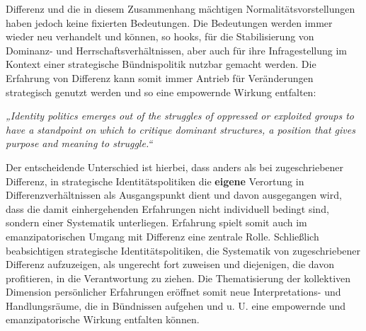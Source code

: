 \noindent Differenz und die in diesem Zusammenhang mächtigen Normalitätsvorstellungen
haben jedoch keine fixierten Bedeutungen. Die Bedeutungen werden immer wieder
neu verhandelt und können, so hooks, für die Stabilisierung von Dominanz- und
Herrschaftsverhältnissen, aber auch für ihre Infragestellung im Kontext einer
strategische Bündnispolitik nutzbar gemacht werden. Die Erfahrung von Differenz
kann somit immer Antrieb für Veränderungen strategisch genutzt werden und so
eine empowernde Wirkung entfalten:
\begin{myenv}
  \textit{„Identity politics emerges out of the struggles of oppressed or
    exploited groups to have a standpoint on which to critique dominant
    structures, a position that gives purpose and meaning to
    struggle.“\footnotemark {}
    }
\end{myenv}
Der entscheidende Unterschied ist hierbei, dass anders als bei zugeschriebener
Differenz, in strategische Identitätspolitiken die \textbf{eigene} Verortung in
Differenzverhältnissen als Ausgangspunkt dient und davon ausgegangen wird, dass
die damit einhergehenden Erfahrungen nicht individuell bedingt sind, sondern
einer Systematik unterliegen. Erfahrung spielt somit auch im emanzipatorischen
Umgang mit Differenz eine zentrale Rolle. Schließlich beabsichtigen
strategische Identitätspolitiken, die Systematik von zugeschriebener Differenz
aufzuzeigen, als ungerecht fort zuweisen und diejenigen, die davon profitieren,
in die Verantwortung zu ziehen. Die Thematisierung der kollektiven Dimension
persönlicher Erfahrungen eröffnet somit neue Interpretations- und
Handlungsräume, die in Bündnissen aufgehen und u. U. eine empowernde und
emanzipatorische Wirkung entfalten können.\\

